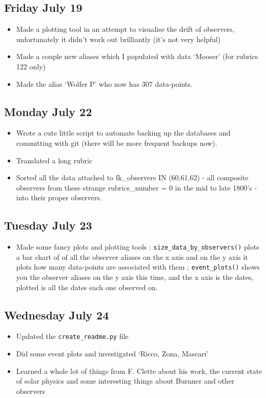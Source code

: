 \documentclass[12pt]{article}
\begin{document}
\subsection{Friday July 19}
\begin{itemize}
    \item Made a plotting tool in an attempt to visualise the drift of observers, unfortunately it didn't work out brilliantly (it's not very helpful)
    \item Made a couple new aliases which I populated with data `Mooser' (for rubrics 122 only)
    \item Made the alias `Wolfer P' who now has 307 data-points.
\end{itemize}

\subsection{Monday July 22}
\begin{itemize}
    \item Wrote a cute little script to automate backing up the databases and committing with git (there will be more frequent backups now).
    \item Translated a long rubric
    \item Sorted all the data attached to fk\_observers IN (60,61,62) - all composite observers from these strange rubrics\_number = 0 in the mid to late 1800's - into their proper observers.
\end{itemize}

\subsection{Tuesday July 23}
\begin{itemize}
    \item Made some fancy plots and plotting tools : \texttt{size\_data\_by\_observers()} plots a bar chart of of all the observer aliases on the x axis and on the y axis it plots how many data-points are associated with them ; \texttt{event\_plots()} shows you the observer aliases on the y axis this time, and the x axis is the dates, plotted is all the dates each one observed on.
\end{itemize}

\subsection{Wednesday July 24}
\begin{itemize}
    \item Updated the \texttt{create\_readme.py} file
    \item Did some event plots and investigated `Ricco, Zona, Mascari'
    \item Learned a whole lot of things from F. Clette about his work, the current state of solar physics and some interesting things about Burnner and other observers
\end{itemize}
\end{document}
